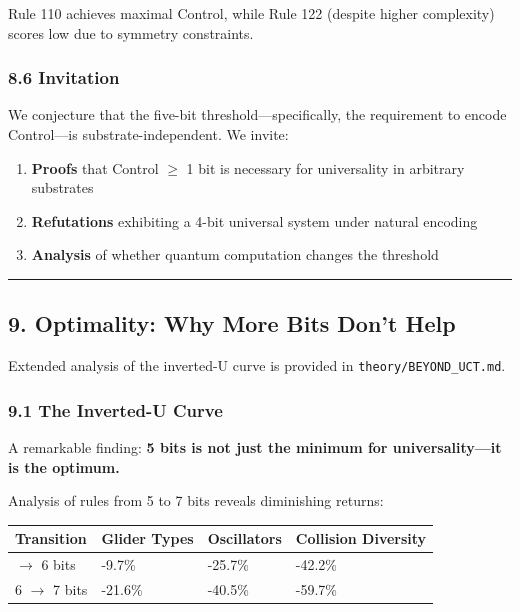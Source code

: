 \documentclass[
  11pt,
]{article}
\providecommand{\tightlist}{%
  \setlength{\itemsep}{0pt}\setlength{\parskip}{0pt}}
\begin{document}
Rule 110 achieves maximal Control, while Rule 122 (despite higher
complexity) scores low due to symmetry constraints.

\hypertarget{invitation}{%
\subsubsection{8.6 Invitation}\label{invitation}}

We conjecture that the five-bit threshold---specifically, the
requirement to encode Control---is substrate-independent. We invite:

\begin{enumerate}
\def\labelenumi{\arabic{enumi}.}
\tightlist
\item
  \textbf{Proofs} that Control $\geq$ 1 bit is necessary for universality in
  arbitrary substrates
\item
  \textbf{Refutations} exhibiting a 4-bit universal system under natural
  encoding
\item
  \textbf{Analysis} of whether quantum computation changes the threshold
\end{enumerate}

\begin{center}\rule{0.5\linewidth}{0.5pt}\end{center}

\hypertarget{optimality-why-more-bits-dont-help}{%
\subsection{9. Optimality: Why More Bits Don't
Help}\label{optimality-why-more-bits-dont-help}}

Extended analysis of the inverted-U curve is provided in
\texttt{theory/BEYOND\_UCT.md}.

\hypertarget{the-inverted-u-curve}{%
\subsubsection{9.1 The Inverted-U Curve}\label{the-inverted-u-curve}}

A remarkable finding: \textbf{5 bits is not just the minimum for
universality---it is the optimum.}

Analysis of rules from 5 to 7 bits reveals diminishing returns:

\begin{longtable}[]{@{}llll@{}}
\toprule\noalign{}
Transition & Glider Types & Oscillators & Collision Diversity \\
\midrule\noalign{}
\endhead
\bottomrule\noalign{}
\endlastfoot
5 $\rightarrow$ 6 bits & -9.7\% & -25.7\% & -42.2\% \\
6 $\rightarrow$ 7 bits & -21.6\% & -40.5\% & -59.7\% \\
\end{longtable}
\end{document}
